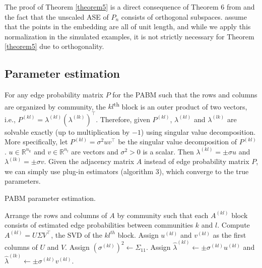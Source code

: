 \documentclass[
  12pt,
]{article}
\begin{document}
\begin{remark}
The proof of Theorem \ref{theorem5} is a direct consequence of Theorem 6 
from  \citeauthor{jmlr-v28-wang13} and the fact that the unscaled ASE of 
$P_n$ consists of orthogonal subspaces. \citeauthor{jmlr-v28-wang13} assume 
that the points in the embedding are all of unit length, and while we apply 
this normalization in the simulated examples, it is not strictly necessary 
for Theorem \ref{theorem5} due to orthogonality. 
\end{remark}

\hypertarget{parameter-estimation}{%
\subsection{Parameter estimation}\label{parameter-estimation}}

For any edge probability matrix \(P\) for the PABM such that the rows
and columns are organized by community, the \(kl\)\textsuperscript{th}
block is an outer product of two vectors, i.e.,
\(P^{(kl)} = \lambda^{(kl)} (\lambda^{(lk)})^\top\). Therefore, given
\(P^{(kl)}\), \(\lambda^{(kl)}\) and \(\lambda^{(lk)}\) are solvable
exactly (up to multiplication by \(-1\)) using singular value
decomposition. More specifically, let \(P^{(kl)} = \sigma^2 u v^\top\)
be the singular value decomposition of \(P^{(kl)}\).
\(u \in \mathbb{R}^{n_k}\) and \(v \in \mathbb{R}^{n_l}\) are vectors
and \(\sigma^2 > 0\) is a scalar. Then \(\lambda^{(kl)} = \pm \sigma u\)
and \(\lambda^{(lk)} = \pm \sigma v\). Given the adjacency matrix \(A\)
instead of edge probability matrix \(P\), we can simply use plug-in
estimators (algorithm 3), which converge to the true parameters.

\begin{algorithm}[t]
  \DontPrintSemicolon
  \SetAlgoLined
  \caption{PABM parameter estimation.}
  Arrange the rows and columns of $A$ by community such that each 
  $A^{(kl)}$ block consists of estimated edge probabilities between 
  communities $k$ and $l$.\;
   {
    Compute $A^{(kl)} = U \Sigma V^\top$, the SVD of the $kl^{th}$ 
    block.\;
    Assign $u^{(kl)}$ and $v^{(kl)}$ as the first columns of $U$ and $V$. 
    Assign $(\sigma^{(kl)})^2 \leftarrow \Sigma_{11}$.\;
    Assign $\hat{\lambda}^{(kl)} \leftarrow \pm \sigma^{(kl)} u^{(kl)}$ and 
    $\hat{\lambda}^{(lk)} \leftarrow \pm \sigma^{(kl)} v^{(kl)}$.
  }
\end{algorithm}
\end{document}
